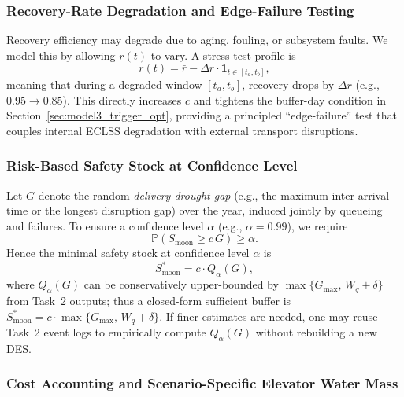 ﻿\documentclass{mcmthesis}
\begin{document}
\subsubsection{Recovery-Rate Degradation and Edge-Failure Testing}
\label{sec:model3_recovery_opt}

Recovery efficiency may degrade due to aging, fouling, or subsystem faults. We model this by allowing $r(t)$ to vary.
A stress-test profile is
\begin{equation}
r(t)=\bar r-\Delta r\cdot \mathbf{1}_{t\in[t_a,t_b]},
\end{equation}
meaning that during a degraded window $[t_a,t_b]$, recovery drops by $\Delta r$ (e.g., $0.95\to 0.85$).
This directly increases $c$ and tightens the buffer-day condition in Section~\ref{sec:model3_trigger_opt},
providing a principled ``edge-failure'' test that couples internal ECLSS degradation with external transport disruptions.

\subsubsection{Risk-Based Safety Stock at Confidence Level}
\label{sec:model3_confidence_opt}

Let $G$ denote the random \emph{delivery drought gap} (e.g., the maximum inter-arrival time or the longest disruption gap)
over the year, induced jointly by queueing and failures. To ensure a confidence level $\alpha$ (e.g., $\alpha=0.99$),
we require
\begin{equation}
\mathbb{P}\left(S_{\text{moon}} \ge c\,G\right)\ge \alpha.
\end{equation}
Hence the minimal safety stock at confidence level $\alpha$ is
\begin{equation}
S_{\text{moon}}^{*}=c\cdot Q_{\alpha}(G),
\end{equation}
where $Q_{\alpha}(G)$ can be conservatively upper-bounded by $\max\{G_{\max},\,W_q+\delta\}$ from Task~2 outputs; thus a closed-form sufficient buffer is $S_{\text{moon}}^{*}\!=\!c\cdot\max\{G_{\max},\,W_q+\delta\}$. If finer estimates are needed, one may reuse Task~2 event logs to empirically compute $Q_{\alpha}(G)$ without rebuilding a new DES.

\subsubsection{Cost Accounting and Scenario-Specific Elevator Water Mass}
\label{sec:model3_cost_opt}
\end{document}
